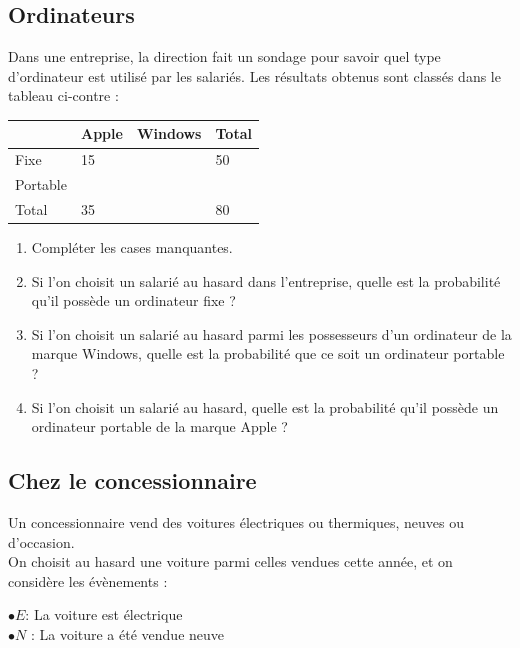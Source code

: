 \documentclass[oneside,12pt]{article}          %
\begin{document}
\subsection{Ordinateurs}
Dans une entreprise, la direction fait un sondage pour savoir quel type d'ordinateur est utilisé par les salariés. Les résultats obtenus sont classés dans le tableau ci-contre :
\begin{center}
	\renewcommand{\arraystretch}{1.75}
    \begin{tabular}{| P{4cm} | P{3cm} | P{3cm} | P{3cm} |}\hline
	     & Apple & Windows & Total\\ \hline
	    Fixe & 15 &  & 50 \\ \hline
	    Portable &  & &  \\ \hline
	    Total & 35 & & 80 \\ \hline
    \end{tabular}
\end{center}
\begin{enumerate}
	\item Compléter les cases manquantes.
	\item Si l'on choisit un salarié au hasard dans l'entreprise, quelle est la probabilité qu'il possède un ordinateur fixe ?
	\item Si l'on choisit un salarié au hasard parmi les possesseurs d'un ordinateur de la marque Windows, quelle est la probabilité que ce soit un ordinateur portable ?
	\item Si l'on choisit un salarié au hasard, quelle est la probabilité qu'il possède un ordinateur portable de la marque Apple ?
\end{enumerate}



\subsection{Chez le concessionnaire}
Un concessionnaire vend des voitures électriques ou thermiques, neuves ou d'occasion.\\
On choisit au hasard une voiture parmi celles vendues cette année, et on considère les évènements :

$\bullet E $: \og La voiture est électrique \fg \\
$\bullet N$ : \og La voiture a été vendue neuve \fg
\end{document}
